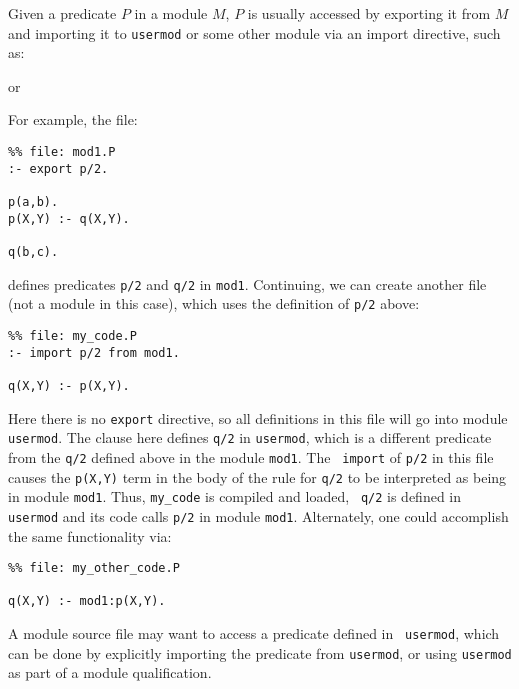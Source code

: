 Given a predicate $P$ in a module $M$, $P$ is usually accessed by
exporting it from $M$ and importing it to {\tt usermod} or some other
module via an import directive, such as:


or


\noindent
For example, the file:
\begin{verbatim}
%% file: mod1.P
:- export p/2.

p(a,b).
p(X,Y) :- q(X,Y).

q(b,c).
\end{verbatim}
defines predicates {\tt p/2} and {\tt q/2} in {\tt mod1}.
%
Continuing, we can create another file (not a module in this case),
which uses the definition of {\tt p/2} above:
\begin{verbatim}
%% file: my_code.P
:- import p/2 from mod1.

q(X,Y) :- p(X,Y).
\end{verbatim}
\noindent Here there is no {\tt export} directive, so all definitions
in this file will go into module {\tt usermod}.  The clause here
defines {\tt q/2} in {\tt usermod}, which is a different predicate
from the {\tt q/2} defined above in the module {\tt mod1}.  The {\tt
  import} of {\tt p/2} in this file causes the {\tt p(X,Y)} term in
the body of the rule for {\tt q/2} to be interpreted as being in
module {\tt mod1}.  Thus, {\tt my\_code} is compiled and loaded, {\tt
  q/2} is defined in {\tt usermod} and its code calls {\tt p/2} in
module {\tt mod1}.  Alternately, one could accomplish the same
functionality via:
\begin{verbatim}
%% file: my_other_code.P

q(X,Y) :- mod1:p(X,Y).
\end{verbatim}

A module source file may want to access a predicate defined in {\tt
  usermod}, which can be done by explicitly importing the predicate
from {\tt usermod}, or using {\tt usermod} as part of a module
qualification.

